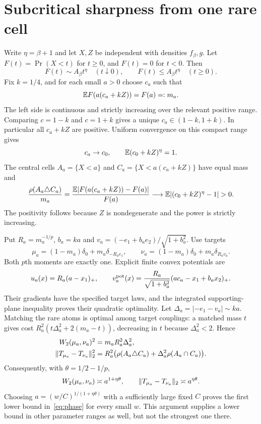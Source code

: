 \documentclass[11pt]{article}
\theoremstyle{remark}\newtheorem{remark}[theorem]{Remark}
\begin{document}
\section{Subcritical sharpness from one rare cell}\label{sec:subcritical}
Write $\eta=\beta+1$ and let $X,Z$ be independent with densities $f_\beta,g$. Let
$F(t)=\Pr(X<t)$ for $t\ge0$, and $F(t)=0$ for $t<0$. Then
\[
 F(t)\sim A_\beta t^\eta\quad(t\downarrow0),\qquad
 F(t)\le A_\beta t^\eta\quad(t\ge0).
\]
Fix $k=1/4$, and for each small $a>0$ choose $c_a$ such that
\begin{equation}\label{eq:rare-match}
 \mathbb E F(a(c_a+kZ))=F(a)=:m_a.
\end{equation}
The left side is continuous and strictly increasing over the relevant positive range. Comparing $c=1-k$ and $c=1+k$ gives a unique $c_a\in(1-k,1+k)$. In particular all $c_a+kZ$ are positive. Uniform convergence on this compact range gives
\[
 c_a\to c_0,\qquad \mathbb E(c_0+kZ)^\eta=1.
\]
The central cells $A_a=\{X<a\}$ and $C_a=\{X<a(c_a+kZ)\}$ have equal mass and
\begin{equation}\label{eq:rare-difference}
 \frac{\rho(A_a\triangle C_a)}{m_a}
 =\frac{\E|F(a(c_a+kZ))-F(a)|}{F(a)}
 \longrightarrow\E|(c_0+kZ)^\eta-1|>0.
\end{equation}
The positivity follows because $Z$ is nondegenerate and the power is strictly increasing.

Put $R_a=m_a^{-1/p}$, $b_a=ka$ and $v_a=(-e_1+b_ae_2)/\sqrt{1+b_a^2}$. Use targets
\[
 \mu_a=(1-m_a)\delta_0+m_a\delta_{-R_ae_1},\qquad
 \nu_a=(1-m_a)\delta_0+m_a\delta_{R_av_a}.
\]
Both $p$th moments are exactly one. Explicit finite convex potentials are
\[
 u_a(x)=R_a(a-x_1)_+,\qquad
 v_a^{\rm pot}(x)=\frac{R_a}{\sqrt{1+b_a^2}}
                      (ac_a-x_1+b_ax_2)_+.
\]
Their gradients have the specified target laws, and the integrated supporting-plane inequality proves their quadratic optimality. Let
$\Delta_a=|-e_1-v_a|\sim ka$. Matching the rare atoms is optimal among target couplings: a matched mass $t$ gives cost
$R_a^2(t\Delta_a^2+2(m_a-t))$, decreasing in $t$ because $\Delta_a^2<2$. Hence
\begin{align*}
 W_2(\mu_a,\nu_a)^2&=m_aR_a^2\Delta_a^2,\\
 \lVert T_{\mu_a}-T_{\nu_a}\rVert_2^2
 &=R_a^2\bigl(\rho(A_a\triangle C_a)
                  +\Delta_a^2\rho(A_a\cap C_a)\bigr).
\end{align*}
Consequently, with $\theta=1/2-1/p$,
\[
 W_2(\mu_a,\nu_a)\asymp a^{1+\eta\theta},\qquad
 \lVert T_{\mu_a}-T_{\nu_a}\rVert_2\asymp a^{\eta\theta}.
\]
Choosing $a=(w/C)^{1/(1+\eta\theta)}$ with a sufficiently large fixed $C$ proves the first lower bound in~\eqref{eq:phase} for every small $w$. This argument supplies a lower bound in other parameter ranges as well, but not the strongest one there.
\end{document}
